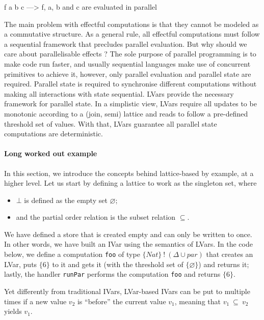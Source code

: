 \documentclass[main.tex]{subfiles}
\begin{document}
f a b c ---> f, a, b and c are evaluated in parallel

The main problem with effectful computations is that they cannot be modeled as a commutative structure. As a general rule, all effectful computations must follow a sequential framework that precludes parallel evaluation. But why should we care about parallelisable effects ? The sole purpose of parallel programming is to make code run faster, and usually sequential languages make use of concurrent primitives to achieve it, however, only parallel evaluation and parallel state are required. Parallel state is required to synchronise different computations without making all interactions with state sequential. LVars provide the necessary framework for parallel state. In a simplistic view, LVars require all updates to be monotonic according to a (join, semi) lattice and reads to follow a pre-defined threshold set of values. With that, LVars guarantee all parallel state computations are deterministic.

\paragraph{Long worked out example}
In this section, we introduce the concepts behind lattice-based by example, at a higher
level. Let us start by defining a lattice to work as the singleton set,
where
\begin{itemize}
\item $\bot$ is defined as the empty set $\varnothing$;
\item and the partial order relation is the subset relation $\subseteq$.
\end{itemize}

We have defined a store that is created empty and can only be
written to once. In other words, we have built an IVar using the semantics of
LVars. In the code below, we define a computation {\tt foo} of type $\{ Nat \} \> ! \>
(\Delta \cup \textit{par})$ that creates an LVar, puts $\{ 6 \}$ to it and gets
it (with the threshold set of $\{ \varnothing \}$) and returns it; lastly, the
handler {\tt runPar} performs the computation {\tt foo} and returns $\{ 6 \}$.

Yet differently from traditional IVars, LVar-based IVars can be put to multiple
times if a new value $v_2$ is ``before'' the current value $v_1$, meaning that $v_1
\> \subseteq \> v_2$ yields $v_1$.
\end{document}
